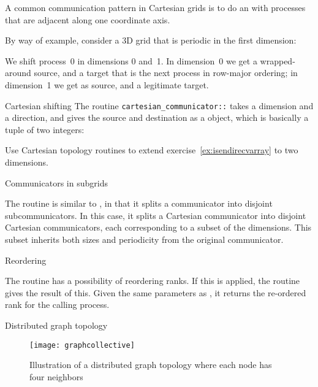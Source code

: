 A common communication pattern in Cartesian grids is to
do an  with processes that are adjacent
along one coordinate axis.

By way of example, consider a 3D grid that is periodic in the first dimension:
%

We shift process~0 in dimensions 0 and~1.
In dimension~0 we get a wrapped-around source,
and a target that is the next process in row-major ordering;
in dimension~1 we get  as source,
and a legitimate target.
%

\begin{mplnote}{Cartesian shifting}
  The routine \lstinline{cartesian_communicator::}
  takes a dimension and a direction,
  and gives the source and destination
  as a  object, which is basically
  a tuple of two integers:
\end{mplnote}

\begin{exercise}
  \label{ex:isendirecvcart}
  Use Cartesian topology routines to extend
  exercise~\ref{ex:isendirecvarray} to two dimensions.
\end{exercise}

 {Communicators in subgrids}

The routine  is similar to
, in that it splits a communicator
into disjoint subcommunicators.
In this case, it splits a Cartesian communicator
into disjoint Cartesian communicators,
each corresponding to a subset of the dimensions.
This subset inherits both sizes and periodicity from the original communicator.


 {Reordering}
\label{sec:mpi-cart-map}

The  routine has a possibility
of reordering ranks. If this is applied,
the routine  gives the result of this.
Given the same parameters as ,
it returns the re-ordered rank for the calling process.

 {Distributed graph topology}
\label{sec:mpi-dist-graph}

\begin{figure}[ht]
  \texttt{[image: graphcollective]}
  \caption{Illustration of a distributed graph topology where each node has four neighbors}
  \label{fig:graphcollective}
\end{figure}

